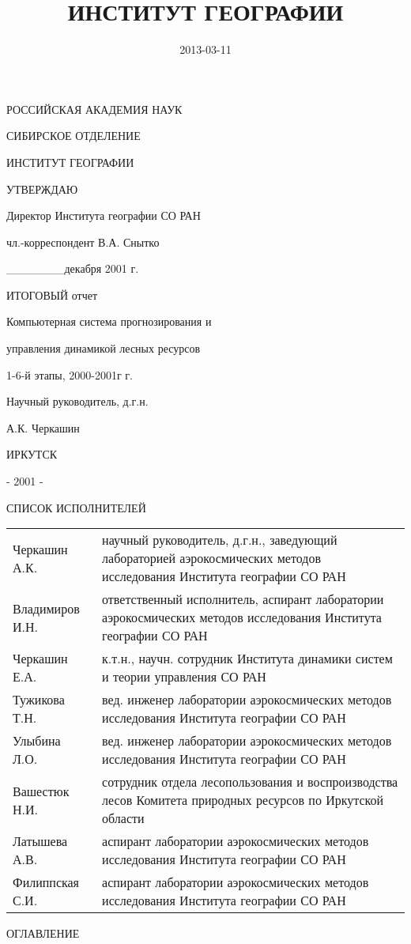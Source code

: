 \documentclass{report}
\title{ИНСТИТУТ ГЕОГРАФИИ}
\author{}
\date{2013-03-11}
\begin{document}
РОССИЙСКАЯ АКАДЕМИЯ НАУК

СИБИРСКОЕ ОТДЕЛЕНИЕ

ИНСТИТУТ ГЕОГРАФИИ

УТВЕРЖДАЮ

Директор Института географии СО РАН

чл.-корреспондент В.А. Снытко

\_\_\_\_\_\_\_декабря 2001 г. 

ИТОГОВЫЙ отчет

Компьютерная система прогнозирования и

 управления динамикой лесных ресурсов

1-6-й этапы, 2000-2001г г.

Научный руководитель, д.г.н. \ \ \ \   

А.К. Черкашин

ИРКУТСК

{}- 2001 - 

СПИСОК ИСПОЛНИТЕЛЕЙ

\begin{flushleft}
\tablefirsthead{}
\tablehead{}
\tabletail{}
\tablelasttail{}
\begin{supertabular}{m{4.55cm}m{11.99cm}}
{ Черкашин А.К.  } &
{ научный руководитель, д.г.н., заведующий лабораторией аэрокосмических методов исследования
Института географии СО РАН}

\\
{ Владимиров И.Н. } &
{ ответственный исполнитель, аспирант лаборатории аэрокосмических методов исследования Института
географии СО РАН}

\\
{ Черкашин Е.А. } &
{ к.т.н., научн. сотрудник Института динамики систем и теории управления СО РАН }

\\
{ Тужикова Т.Н. } &
{ вед. инженер лаборатории аэрокосмических методов исследования Института географии СО РАН }

\\
{ Улыбина Л.О. } &
{ вед. инженер лаборатории аэрокосмических методов исследования Института географии СО РАН }

\\
{ Вашестюк Н.И. } &
{ сотрудник отдела лесопользования и воспроизводства лесов Комитета природных ресурсов по
Иркутской области}

\\
{ Латышева А.В. } &
{ аспирант лаборатории аэрокосмических методов исследования Института географии СО РАН }

\\
{ Филиппская С.И. } &
{ аспирант лаборатории аэрокосмических методов исследования Института географии СО РАН}\\
\end{supertabular}
\end{flushleft}
ОГЛАВЛЕНИЕ
\end{document}
